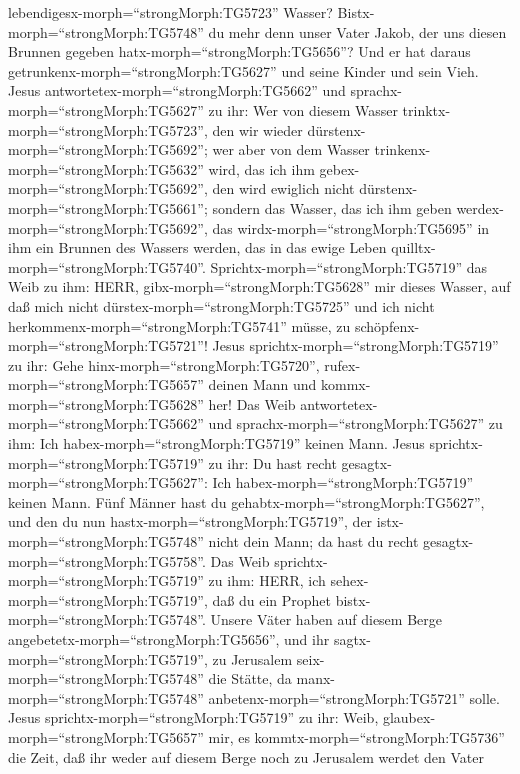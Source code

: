 lebendigesx-morph=``strongMorph:TG5723'' Wasser? 
Bistx-morph=``strongMorph:TG5748'' du mehr denn unser Vater Jakob, der
uns diesen Brunnen gegeben hatx-morph=``strongMorph:TG5656''? Und er hat
daraus getrunkenx-morph=``strongMorph:TG5627'' und seine Kinder und sein
Vieh.  Jesus antwortetex-morph=``strongMorph:TG5662'' und
sprachx-morph=``strongMorph:TG5627'' zu ihr: Wer von diesem Wasser
trinktx-morph=``strongMorph:TG5723'', den wir wieder
dürstenx-morph=``strongMorph:TG5692'';  wer aber von dem
Wasser trinkenx-morph=``strongMorph:TG5632'' wird, das ich ihm
gebex-morph=``strongMorph:TG5692'', den wird ewiglich nicht
dürstenx-morph=``strongMorph:TG5661''; sondern das Wasser, das ich ihm
geben werdex-morph=``strongMorph:TG5692'', das
wirdx-morph=``strongMorph:TG5695'' in ihm ein Brunnen des Wassers
werden, das in das ewige Leben quilltx-morph=``strongMorph:TG5740''.
 Sprichtx-morph=``strongMorph:TG5719'' das Weib zu ihm:
HERR, gibx-morph=``strongMorph:TG5628'' mir dieses Wasser, auf daß mich
nicht dürstex-morph=``strongMorph:TG5725'' und ich nicht
herkommenx-morph=``strongMorph:TG5741'' müsse, zu
schöpfenx-morph=``strongMorph:TG5721''!  Jesus
sprichtx-morph=``strongMorph:TG5719'' zu ihr: Gehe
hinx-morph=``strongMorph:TG5720'', rufex-morph=``strongMorph:TG5657''
deinen Mann und kommx-morph=``strongMorph:TG5628'' her! 
Das Weib antwortetex-morph=``strongMorph:TG5662'' und
sprachx-morph=``strongMorph:TG5627'' zu ihm: Ich
habex-morph=``strongMorph:TG5719'' keinen Mann. Jesus
sprichtx-morph=``strongMorph:TG5719'' zu ihr: Du hast recht
gesagtx-morph=``strongMorph:TG5627'': Ich
habex-morph=``strongMorph:TG5719'' keinen Mann.  Fünf
Männer hast du gehabtx-morph=``strongMorph:TG5627'', und den du nun
hastx-morph=``strongMorph:TG5719'', der
istx-morph=``strongMorph:TG5748'' nicht dein Mann; da hast du recht
gesagtx-morph=``strongMorph:TG5758''.  Das Weib
sprichtx-morph=``strongMorph:TG5719'' zu ihm: HERR, ich
sehex-morph=``strongMorph:TG5719'', daß du ein Prophet
bistx-morph=``strongMorph:TG5748''.  Unsere Väter haben auf
diesem Berge angebetetx-morph=``strongMorph:TG5656'', und ihr
sagtx-morph=``strongMorph:TG5719'', zu Jerusalem
seix-morph=``strongMorph:TG5748'' die Stätte, da
manx-morph=``strongMorph:TG5748'' anbetenx-morph=``strongMorph:TG5721''
solle.  Jesus sprichtx-morph=``strongMorph:TG5719'' zu ihr:
Weib, glaubex-morph=``strongMorph:TG5657'' mir, es
kommtx-morph=``strongMorph:TG5736'' die Zeit, daß ihr weder auf diesem
Berge noch zu Jerusalem werdet den Vater

